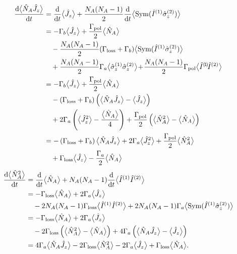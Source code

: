 \begin{align}
\frac{{\mathrm d} {\big\langle \hat{N}_A\hat{J}_z \big\rangle}}{{\mathrm d}t} &=\frac{{\mathrm d} {}}{{\mathrm d}t} \big\langle \hat{J}_z  \big\rangle + \frac{N_A(N_A-1)}{2} \frac{{\mathrm d} {}}{{\mathrm d}t}\big\langle \mathrm{Sym}(\hat{I}^{(1)}\hat{\sigma}_z^{(2)} )  \big\rangle\\
&= -\Gamma_b \big\langle \hat{J}_z \big\rangle +\frac{\Gamma_{\rm pol}}{2}\big\langle \hat{N}_A \big\rangle \nonumber\\
&\quad -\frac{N_A(N_A-1)}{2}(\Gamma_{\rm loss}+\Gamma_b) \big\langle \mathrm{Sym}( \hat{I}^{(1)}\hat{\sigma}_z^{(2)} )  \big\rangle\nonumber\\
&\quad +\frac{N_A(N_A-1)}{2}\Gamma_a\big\langle \hat{\sigma}_z^{(1)} \hat{\sigma}_z^{(2)} \big\rangle \!+\! \frac{N_A(N_A-1)}{2}\Gamma_{\rm pol} \big\langle \hat{I}^{(\!1\!)}\!\hat{I}^{(2)}  \big\rangle\\
&= -\Gamma_b \big\langle \hat{J}_z \big\rangle +\frac{\Gamma_{\rm pol}}{2}\big\langle \hat{N}_A \big\rangle \nonumber\\
&\quad -(\Gamma_{\rm loss}+\Gamma_b) \left( \big\langle  \hat{N}_A\hat{J}_z  \big\rangle-\big\langle \hat{J}_z \big\rangle\right)\nonumber\\
&\quad+2\Gamma_a\left(\big\langle \hat{J}_z^2  \big\rangle-\frac{\big\langle \hat{N}_A \big\rangle}{4}\right)+\frac{\Gamma_{\rm pol}}{2}\left(\big\langle \hat{N}_A^2 \big\rangle-\big\langle \hat{N}_A \big\rangle\right)\\
&=-\left(\Gamma_{\rm loss}+\Gamma_b\right)\big\langle \hat{N}_A \hat{J}_z \big\rangle +2\Gamma_a\big\langle \hat{J}_z^2 \big\rangle+\frac{\Gamma_{\rm pol}}{2}\big\langle \hat{N}_A^2  \big\rangle\nonumber\\ 
&\quad+\Gamma_{\rm loss} \big\langle \hat{J}_z \big\rangle -\frac{\Gamma_a}{2}\big\langle \hat{N}_A \big\rangle
\end{align}
\begin{align}
\frac{{\mathrm d} {\big\langle \hat{N}_A^2 \big\rangle}}{{\mathrm d}t} &= \frac{{\mathrm d} {}}{{\mathrm d}t}\big\langle \hat{N}_A \big\rangle + N_A(N_A-1)\frac{{\mathrm d} {}}{{\mathrm d}t}\big\langle \hat{I}^{(1)}\hat{I}^{(2)} \big\rangle\\
&= -\Gamma_{\rm loss}\big\langle \hat{N}_A \big\rangle +2\Gamma_a \big\langle \hat{J}_z \big\rangle\nonumber\\
&\quad -2N_A(N_A-1)\Gamma_{\rm loss}\big\langle \hat{I}^{(1)} \hat{I}^{(2)} \big\rangle +2N_A(N_A-1)\Gamma_a\big\langle \mathrm{Sym}(\hat{I}^{(1)} \hat{\sigma}_z^{(2)}) \big\rangle\nonumber\\
&= -\Gamma_{\rm loss}\big\langle \hat{N}_A \big\rangle +2\Gamma_a \big\langle \hat{J}_z \big\rangle\nonumber\\
&\quad - 2\Gamma_{\rm loss} \left(\big\langle \hat{N}_A^2 \big\rangle-\big\langle \hat{N}_A \big\rangle \right) + 4\Gamma_a \left(\big\langle \hat{N}_A\hat{J}_z \big\rangle -\big\langle \hat{J}_z \big\rangle \right)\\
&= 4\Gamma_a \big\langle \hat{N}_A\hat{J}_z \big\rangle -2\Gamma_{\rm loss}\big\langle \hat{N}_A^2 \big\rangle -2\Gamma_a \big\langle \hat{J}_z \big\rangle +\Gamma_{\rm loss}\big\langle \hat{N}_A \big\rangle .
\end{align}
